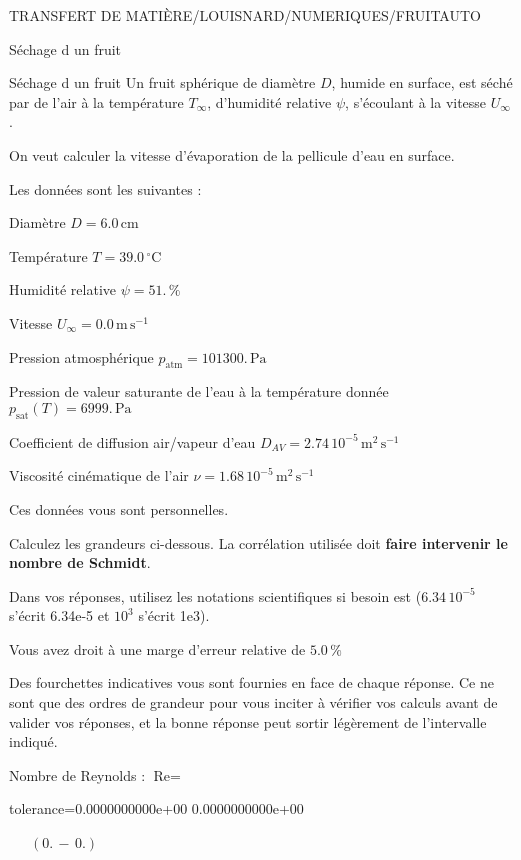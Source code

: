 \documentclass[12pt]{article}
\begin{document}
\begin{quiz}{TRANSFERT DE MATIÈRE/LOUISNARD/NUMERIQUES/FRUITAUTO}
\begin{cloze}{Séchage d un fruit}
\end{cloze} 


 \begin{cloze}{Séchage d un fruit} 
Un fruit sphérique de diamètre $D$, humide en surface, est séché par de l'air à la température $T_\infty$, d'humidité relative $\psi$, s'écoulant à la vitesse $U_\infty$.

On veut calculer la vitesse d'évaporation de la pellicule d'eau en surface.

 

Les données sont les suivantes :

 

Diamètre $D = 6.0\,  \mathrm{cm} $

Température $T = 39.0\,  \mathrm{^\circ\mathrm{C}} $

Humidité relative $\psi = 51.\, \% $

Vitesse $U_\infty = 0.0\,  \mathrm{m}\,  \mathrm{s}^{-1} $

Pression atmosphérique $p_{\text{atm}} = 101300.\,  \mathrm{Pa} $

Pression de valeur saturante de l’eau à la température donnée $p_{\text{sat}}(T) = 6999.\,  \mathrm{Pa} $

Coefficient de diffusion air/vapeur d’eau $D_{AV} =  2.74 \, 10^{-5} \,  \mathrm{m}^{2}\,  \mathrm{s}^{-1} $

Viscosité cinématique de l’air $\nu =  1.68 \, 10^{-5} \,  \mathrm{m}^{2}\,  \mathrm{s}^{-1} $

Ces données vous sont personnelles.

 

Calculez les grandeurs ci-dessous. La corrélation utilisée doit \textbf{faire intervenir le nombre de Schmidt}.

Dans vos réponses, utilisez les notations scientifiques si besoin est ($6.34\, 10^{-5}$ s'écrit 6.34e-5 et $10^{3}$ s'écrit 1e3).

Vous avez droit à une marge d'erreur relative de $5.0\, \% $

Des fourchettes indicatives vous sont fournies en face de chaque réponse. Ce ne sont que des ordres de grandeur pour vous inciter à vérifier vos calculs avant de valider vos réponses, et la bonne réponse peut sortir légèrement de l'intervalle indiqué.

 

Nombre de Reynolds : $\text{Re} =  $
\begin{numerical}[points=1] 
\item[tolerance={0.0000000000e+00}] 0.0000000000e+00 
\end{numerical} 
 $\,$ 
 $ \quad (0. \, - \, 0.) $ 


\end{cloze}
\end{quiz}
\end{document}
